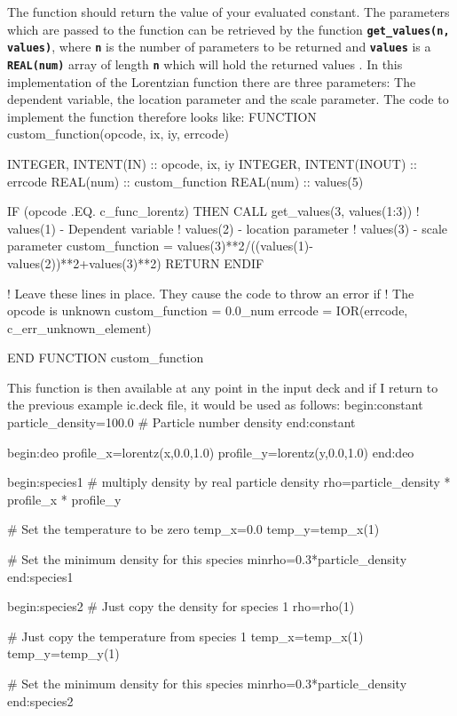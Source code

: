 \documentclass[12pt,a4paper]{article}
\newcommand{\inlinecode}[1]{{\color{warwickred} \bf\texttt{#1}}}
\newenvironment{boxverbatim}{\lboxverbatim{none}}{\endlboxverbatim}
\begin{document}
The function should return the value of your evaluated constant. The
parameters which are passed to the function can be retrieved by the function
\inlinecode {get\_values(n, values)}, where \inlinecode {n} is the number of
parameters to be returned and \inlinecode{values} is a \inlinecode{REAL(num)}
array of length \inlinecode{n} which will hold the returned values .  In this
implementation of the Lorentzian function there are three parameters: The
dependent variable, the location parameter and the scale parameter. The code
to implement the function therefore looks like:
\begin{boxverbatim}
FUNCTION custom_function(opcode, ix, iy, errcode)

  INTEGER, INTENT(IN) :: opcode, ix, iy
  INTEGER, INTENT(INOUT) :: errcode
  REAL(num) :: custom_function
  REAL(num) :: values(5)

  IF (opcode .EQ. c_func_lorentz) THEN
    CALL get_values(3, values(1:3))
    ! values(1) - Dependent variable
    ! values(2) - location parameter
    ! values(3) - scale parameter
    custom_function = values(3)**2/((values(1)-values(2))**2+values(3)**2)
    RETURN
  ENDIF

  ! Leave these lines in place. They cause the code to throw an error if
  ! The opcode is unknown
  custom_function = 0.0_num
  errcode = IOR(errcode, c_err_unknown_element)

END FUNCTION custom_function
\end{boxverbatim}

This function is then available at any point in the input deck and if I return
to the previous example ic.deck file, it would be used as follows:
\begin{boxverbatim}
begin:constant
   particle_density=100.0 # Particle number density
end:constant

begin:deo
   profile_x=lorentz(x,0.0,1.0)
   profile_y=lorentz(y,0.0,1.0)
end:deo

begin:species1
   # multiply density by real particle density
   rho=particle_density * profile_x * profile_y

   # Set the temperature to be zero
   temp_x=0.0
   temp_y=temp_x(1)

   # Set the minimum density for this species
   minrho=0.3*particle_density
end:species1

begin:species2
   # Just copy the density for species 1
   rho=rho(1)

   # Just copy the temperature from species 1
   temp_x=temp_x(1)
   temp_y=temp_y(1)

   # Set the minimum density for this species
   minrho=0.3*particle_density
end:species2
\end{boxverbatim}
\end{document}
